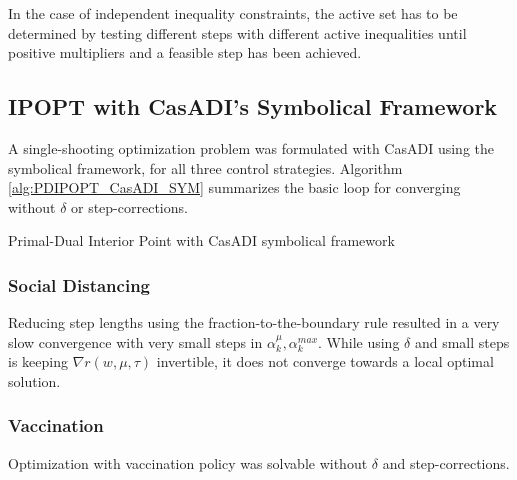 In the case of independent inequality constraints, the active set has to be determined by testing different steps with different active inequalities until positive multipliers and a feasible step has been achieved.

\subsection{IPOPT with CasADI's Symbolical Framework}
A single-shooting optimization problem was formulated with CasADI using the symbolical framework, for all three control strategies. Algorithm \ref{alg:PDIPOPT_CasADI_SYM} summarizes the basic loop for converging without $\delta$ or step-corrections.

\begin{algorithm}[H]
\SetAlgoLined
{}

 \caption{Primal-Dual Interior Point with CasADI symbolical framework}
 \label{alg:PDIPOPT_CasADI_SYM}
\end{algorithm}

\subsubsection{Social Distancing}

Reducing step lengths using the fraction-to-the-boundary rule resulted in a very slow convergence with very small steps in $\alpha_k^\mu, \alpha_k^{max}$. While using $\delta$ and small steps is keeping $\nabla r(w, \mu, \tau)$ invertible, it does not converge towards a local optimal solution.

\subsubsection{Vaccination}

Optimization with vaccination policy was solvable without $\delta$ and step-corrections.

